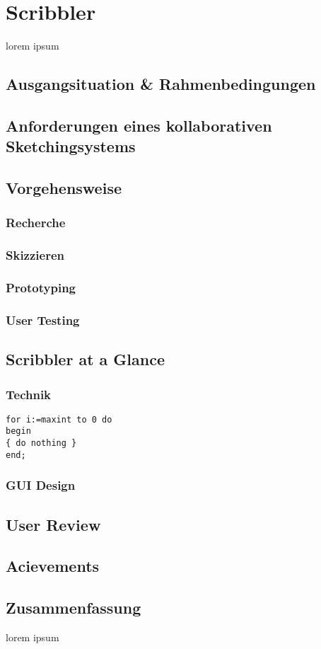 \chapter{Scribbler}\label{ch:scribbler}

lorem ipsum

\section{Ausgangsituation \& Rahmenbedingungen}

\section{Anforderungen eines kollaborativen Sketchingsystems}

\section{Vorgehensweise}

\subsection{Recherche}
\subsection{Skizzieren}
\subsection{Prototyping}
\subsection{User Testing}

\section{Scribbler at a Glance}

\subsection{Technik}
\begin{lstlisting}[float,caption=A scribbler code snippet]
for i:=maxint to 0 do
begin
{ do nothing }
end;
\end{lstlisting}

\subsection{GUI Design}

\section{User Review}

\section{Acievements}

\section*{Zusammenfassung}
lorem ipsum